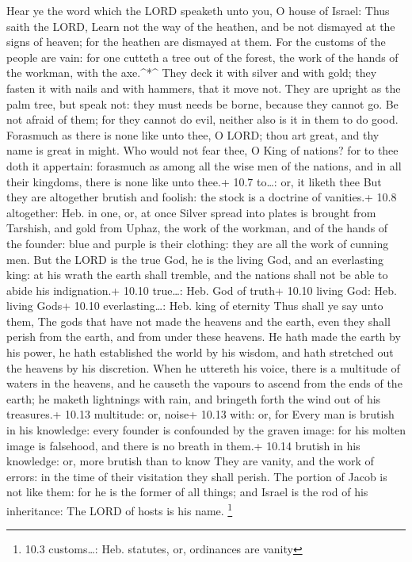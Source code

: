  Hear ye the word which the LORD speaketh unto you, O house
of Israel:  Thus saith the LORD, Learn not the way of the
heathen, and be not dismayed at the signs of heaven; for the heathen are
dismayed at them.  For the customs of the people are vain:
for one cutteth a tree out of the forest, the work of the hands of the
workman, with the axe.\^{}*\^{}  They deck it with silver
and with gold; they fasten it with nails and with hammers, that it move
not.  They are upright as the palm tree, but speak not: they
must needs be borne, because they cannot go. Be not afraid of them; for
they cannot do evil, neither also is it in them to do good. 
Forasmuch as there is none like unto thee, O LORD; thou art great, and
thy name is great in might.  Who would not fear thee, O King
of nations? for to thee doth it appertain: forasmuch as among all the
wise men of the nations, and in all their kingdoms, there is none like
unto thee.+ 10.7 to\ldots: or, it liketh thee  But they are
altogether brutish and foolish: the stock is a doctrine of vanities.+
10.8 altogether: Heb. in one, or, at once  Silver spread
into plates is brought from Tarshish, and gold from Uphaz, the work of
the workman, and of the hands of the founder: blue and purple is their
clothing: they are all the work of cunning men.  But the
LORD is the true God, he is the living God, and an everlasting king: at
his wrath the earth shall tremble, and the nations shall not be able to
abide his indignation.+ 10.10 true\ldots: Heb. God of truth+ 10.10
living God: Heb. living Gods+ 10.10 everlasting\ldots: Heb. king of
eternity  Thus shall ye say unto them, The gods that have
not made the heavens and the earth, even they shall perish from the
earth, and from under these heavens.  He hath made the
earth by his power, he hath established the world by his wisdom, and
hath stretched out the heavens by his discretion.  When he
uttereth his voice, there is a multitude of waters in the heavens, and
he causeth the vapours to ascend from the ends of the earth; he maketh
lightnings with rain, and bringeth forth the wind out of his treasures.+
10.13 multitude: or, noise+ 10.13 with: or, for  Every man
is brutish in his knowledge: every founder is confounded by the graven
image: for his molten image is falsehood, and there is no breath in
them.+ 10.14 brutish in his knowledge: or, more brutish than to know
 They are vanity, and the work of errors: in the time of
their visitation they shall perish.  The portion of Jacob
is not like them: for he is the former of all things; and Israel is the
rod of his inheritance: The LORD of hosts is his name. \footnote{10.3
  customs\ldots: Heb. statutes, or, ordinances are vanity}

